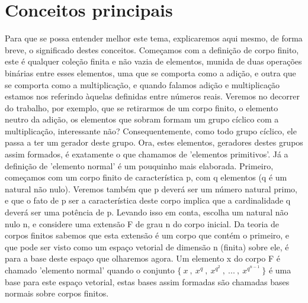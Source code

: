 \documentclass[12pt,twoside]{article}
\begin{document}

  \section*{Conceitos principais}
    Para que se possa entender melhor este tema, explicaremos aqui mesmo, de
    forma breve, o significado destes conceitos. Começamos com a definição de corpo
    finito, este é qualquer coleção finita e não vazia de elementos, munida de duas
    operações binárias entre esses elementos, uma que se comporta como a adição, e
    outra que se comporta como a multiplicação, e quando falamos adição e
    multiplicação estamos nos referindo àquelas definidas entre números reais. Veremos
    no decorrer do trabalho, por exemplo, que se retirarmos de um corpo finito, o
    elemento neutro da adição, os elementos que sobram formam um grupo cíclico com
    a multiplicação, interessante não? Consequentemente, como todo grupo cíclico, ele
    passa a ter um gerador deste grupo. Ora, estes elementos, geradores destes grupos
    assim formados, é exatamente o que chamamos de 'elementos primitivos'. Já a
    definição de 'elemento normal' é um pouquinho mais elaborada. Primeiro,
    começamos com um corpo finito de característica p, com q elementos (q é um
    natural não nulo). Veremos também que p deverá ser um número natural primo, e
    que o fato de p ser a característica deste corpo implica que a cardinalidade q deverá
    ser uma potência de p. Levando isso em conta, escolha um natural não nulo n, e
    considere uma extensão F de grau n do corpo inicial. Da teoria de corpos finitos
    sabemos que esta extensão é um corpo que contém o primeiro, e que pode ser visto
    como um espaço vetorial de dimensão n (finita) sobre ele, é para a base deste
    espaço que olharemos agora. Um elemento x do corpo F é chamado 'elemento normal' quando o 
    conjunto $\{ \ x \ , \ x^{q} \ , \ x^{q^{2}} \ , \ ... \ , \ x^{q^{n-1}} \ \}$ é uma base 
    para este espaço vetorial, estas bases assim formadas são chamadas bases 
    normais sobre corpos finitos. \\
    

\end{document}
